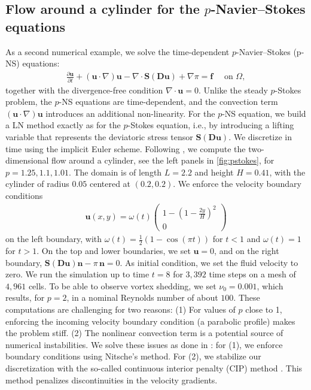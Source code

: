 \documentclass[11pt,pdflatex,sn-mathphys-num]{sn-jnl}
\theoremstyle{thmstyleone}%
\theoremstyle{thmstyletwo}%
\theoremstyle{thmstylethree}%
\newcommand{\bs}[1]{\ensuremath{\boldsymbol{#1}}}
\begin{document}
\subsection{Flow around a cylinder for the $p$-Navier--Stokes equations} \label{ssec:p-NS}
As a second numerical example, we solve the time-dependent $p$-Navier--Stokes (p-NS) equations:
\begin{align*}
    \frac{\partial \bs{u}}{\partial t} + (\bs{u}\cdot\nabla)\bs{u}-\nabla\!\cdot\!\bs{S}\!\left(\bs{D}\bs{u}\right) + \nabla\pi
   = \bs{f} \quad \text{ on } \Omega,
\end{align*}
together with the divergence-free condition $\nabla\cdot \bs u=0$. Unlike the steady $p$-Stokes problem, the $p$-NS equations are time-dependent, and the convection term  $(\bs{u}\cdot\nabla)\bs{u}$ introduces an additional non-linearity.
For the $p$-NS equation, we build a LN method exactly as for the $p$-Stokes equation, i.e., by introducing a lifting variable that represents the deviatoric stress tensor $\bs{S}(\bs{D}\bs u)$. We discretize in time using the implicit Euler scheme. 
Following \cite{MM-pNavierStokes}, we compute the two-dimensional flow around a cylinder, see the left panels in \cref{fig:pstokes}, for $p=1.25, 1.1, 1.01$. The domain is of length $L = 2.2$ and height $H = 0.41$, with the cylinder of radius $0.05$ centered at $(0.2,0.2)$. We enforce the velocity boundary conditions 
\begin{align*}
    \bs{u}(x,y) = \omega(t) \left( \begin{array}{c}
         1 - \left( 1 - \frac{2y}{H}\right)^2 \\
          0
    \end{array}\right)
\end{align*}
on the left boundary, with $\omega(t) = \frac{1}{2}(1 - \cos{(\pi t)})$ for $t<1$ and $\omega(t) = 1$ for $t>1$. On the top and lower boundaries, we set $\bs{u} = 0$, and on the right boundary, $\bs{S}\!\left(\bs{D}\bs u\right)\bs{n} - \pi\,\bs{n} = 0$. As initial condition, we set the fluid velocity to zero.
We run the simulation up to time $t = 8$ for $3{,}392$ time steps on a mesh of $4{,}961$ cells. To be able to observe vortex shedding, we set $\nu_0 = 0.001$, which results, for $p=2$, in a nominal Reynolds number of about $100$.
These computations are challenging for two reasons: (1) For values of $p$ close to 1, enforcing the incoming velocity boundary condition (a parabolic profile) makes the problem stiff. 
(2) The nonlinear convection term is a potential source of numerical instabilities. We solve these issues as done in \cite{MM-pNavierStokes}: for (1), we enforce boundary conditions using Nitsche's method.
For (2), we stabilize our discretization with the so-called continuous interior penalty (CIP) method \cite{burman2007}. This method penalizes discontinuities in the velocity gradients.
\end{document}
